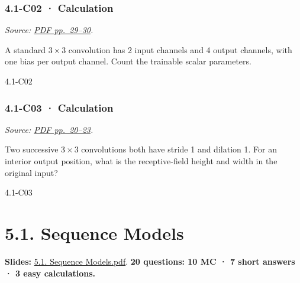 \noindent\begin{minipage}{\linewidth}

\subsubsection{4.1-C02 · Calculation}\label{c02-calculation-11}

\emph{Source: \href{../Lecture\%20Slides/4.1.\%20CNNs.pdf\#page=29}{PDF
pp.~29--30}.}

A standard \(3\times3\) convolution has 2 input channels and 4 output
channels, with one bias per output channel. Count the trainable scalar
parameters.

\begin{solution}[26mm]{4.1-C02}

\end{solution}
\end{minipage}\par\medskip

\noindent\begin{minipage}{\linewidth}

\subsubsection{4.1-C03 · Calculation}\label{c03-calculation-11}

\emph{Source: \href{../Lecture\%20Slides/4.1.\%20CNNs.pdf\#page=20}{PDF
pp.~20--23}.}

Two successive \(3\times3\) convolutions both have stride 1 and dilation
1. For an interior output position, what is the receptive-field height
and width in the original input?

\begin{solution}[26mm]{4.1-C03}

\end{solution}
\end{minipage}\par\medskip

\clearpage

\section{5.1. Sequence Models}\label{sequence-models}

\textbf{Slides:}
\href{../Lecture\%20Slides/5.1.\%20Sequence\%20Models.pdf}{5.1. Sequence
Models.pdf}. \textbf{20 questions: 10 MC · 7 short answers · 3 easy
calculations.}


